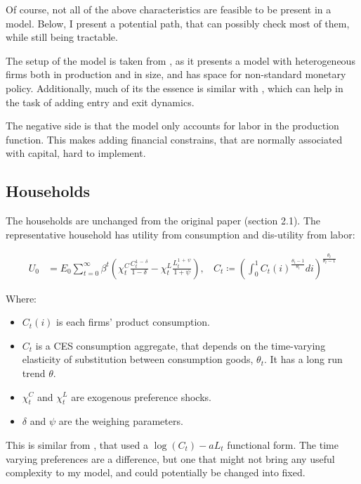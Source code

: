 \documentclass[12pt]{article}
\begin{document}
Of course, not all of the above characteristics are feasible to be present in a model. Below, I present a potential path, that can possibly check most of them, while still being tractable.

The setup of the model is taken from \cite{ellison_2014}, as it presents a model with heterogeneous firms both in production and in size, and has space for non-standard monetary policy. Additionally, much of its the essence is similar with \cite{hopenhayn_1993}, which can help in the task of adding entry and exit dynamics.

The negative side is that the model only accounts for labor in the production function. This makes adding financial constrains, that are normally associated with capital, hard to implement.


\subsection{Households}

The households are unchanged from the original paper (section 2.1). The representative household has utility from consumption and dis-utility from labor:

\begin{align*}
    U_{0} &=E_{0}\sum_{t=0}^{\infty}\beta^{t}\left(\chi_{t}^{C}\frac{C_{t}^{1\,-\,\delta}}{1-\delta}-\chi_{t}^{L}\frac{L_{t}^{1\,+\,\psi}}{1+\psi}\right), ~~~~ C_t \coloneqq \left(\int_0^1C_t(i)^{\frac{\theta_t - 1}{\theta_t}} di\right)^{\frac{\theta_t}{\theta_t - 1}}
\end{align*}

Where:

\begin{itemize}
    \item $C_t(i)$ is each firms' product consumption.
    \item $C_t$ is a CES consumption aggregate, that depends on the time-varying elasticity of substitution between consumption goods, $\theta_t$. It has a long run trend $\theta$.
    \item $\chi_t^C$ and $\chi_t^L$ are exogenous preference shocks.
    \item $\delta$ and $\psi$ are the weighing parameters.
\end{itemize}

This is similar from \cite{hopenhayn_1993}, that used a $\log(C_t) - aL_t$ functional form. The time varying preferences are a difference, but one that might not bring any useful complexity to my model, and could potentially be changed into fixed.
\end{document}
